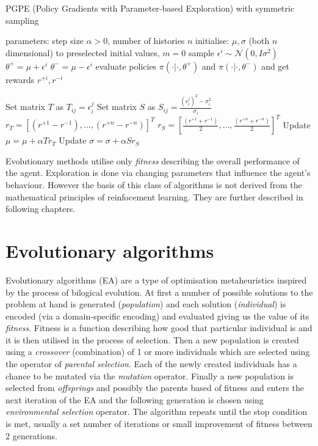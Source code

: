 \begin{algorithm}[h]
    \begin{algorithmic}[1]
    \caption{PGPE (Policy Gradients with Parameter-based Exploration) with symmetric sampling}
    \label{alg:pgpe}
        \State parameters: step size $\alpha>0$, number of histories $n$ 
        \State initialise: $\mu, \sigma$ (both $n$ dimensional) to preselected initial values, $m=0$
        \Repeat
                \State sample $\epsilon^i \sim \mathcal{N}(0,I\sigma^2)$
                \State $\theta^+ = \mu+\epsilon^i$
                \State $\theta^- = \mu-\epsilon^i$
                \State evaluate policies $\pi(\cdot|\cdot,\theta^+)$ and $\pi(\cdot|\cdot, \theta^-)$ and get rewards $r^{+i}, r^{-i}$
                
            \EndFor
            \State Set matrix $T$ as $T_{ij} = \epsilon_i^j$
            \State Set matrix $S$ as $S_{ij} = \frac{(\epsilon^j_i)^2-\sigma_i^2}{\sigma_i}$
            \State $r_T = [(r^{+1}-r^{-1}),\dots,(r^{+n}-r^{-n})]^T$
            \State $r_S = [\frac{(r^{+1}+r^{-1})}{2},\dots,\frac{(r^{+n}+r^{-n})}{2}]^T$
            \State Update $\mu = \mu + \alpha T r_T$
            \State Update $\sigma = \sigma + \alpha S r_S$
    \end{algorithmic}
\end{algorithm}


Evolutionary methods utilise only \emph{fitness} describing the overall performance of the agent. Exploration is done via changing parameters that influence the agent's behaviour. However the basis of this class of algorithms is not derived from the mathematical principles of reinfocement learning. They are further described in following chapters.

\section{Evolutionary algorithms}
\label{sec:ea}
Evolutionary algorithms (EA) are a type of optimisation metaheuristics inspired by the process of bilogical evolution. At first a number of possible solutions to the problem at hand is generated (\emph{population}) and each solution (\emph{individual}) is encoded (via a domain-specific encoding) and evaluated giving us the value of its \emph{fitness}. Fitness is a function describing how good that particular individual is and it is then utilised in the process of selection. Then a new population is created using a \emph{crossover} (combination) of 1 or more individuals which are selected using the operator of \emph{parental selection}. Each of the newly created individuals has a chance to be mutated via the \emph{mutation} operator. Finally a new population is selected from \emph{offsprings} and possibly the parents based of fitness and enters the next iteration of the EA and the following generation is chosen using \emph{environmental selection} operator. The algorithm repeats until the stop condition is met, usually a set number of iterations or small improvement of fitness between 2 generations. 

